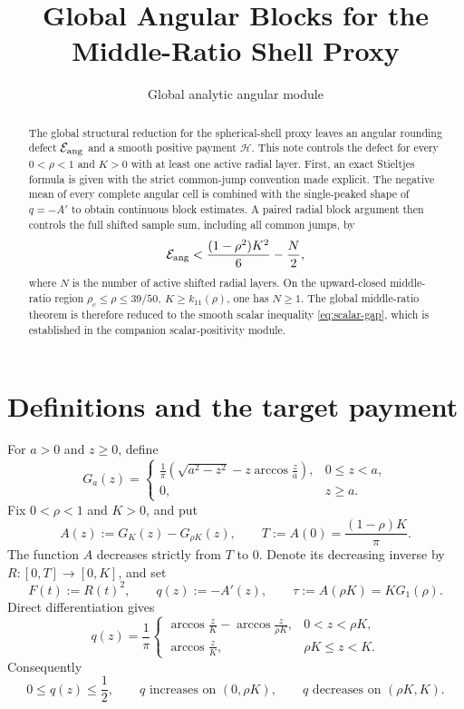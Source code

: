 \documentclass[11pt]{article}
\title{Global Angular Blocks for the Middle-Ratio Shell Proxy}
\author{}
\date{Global analytic angular module}
\theoremstyle{remark}
\begin{document}
\maketitle

\begin{abstract}
The global structural reduction for the spherical-shell proxy leaves an
angular rounding defect $\mathcal E_{\rm ang}$ and a smooth positive payment
$\mathcal H$.  This note controls the defect for every $0<\rho<1$ and $K>0$
with at least one active radial layer.  First, an exact Stieltjes formula is
given with the strict common-jump convention made explicit.  The negative
mean of every complete angular cell is combined with the single-peaked shape
of $q=-A'$ to obtain continuous block estimates.  A paired radial block
argument then controls the full shifted sample sum, including all common
jumps, by
\[
 \mathcal E_{\rm ang}
 <\frac{(1-\rho^2)K^2}{6}-\frac N2,
\]
where $N$ is the number of active shifted radial layers.  On the
upward-closed middle-ratio region
\(
 \rho_c\leq\rho\leq39/50,
 \ K\geq k_{11}(\rho)
\), one has $N\geq1$.  The global middle-ratio theorem is therefore reduced
to the smooth scalar inequality \eqref{eq:scalar-gap}, which is established
in the companion scalar-positivity module.
\end{abstract}

\section{Definitions and the target payment}

For $a>0$ and $z\geq0$, define
\begin{equation}
 G_a(z)=
 \begin{cases}
 \displaystyle\frac1\pi\left(\sqrt{a^2-z^2}
       -z\arccos\frac za\right),&0\leq z<a,\\[4pt]
 0,&z\geq a.
 \end{cases}
 \label{eq:G}
\end{equation}
Fix $0<\rho<1$ and $K>0$, and put
\begin{equation}
 A(z):=G_K(z)-G_{\rho K}(z),
 \qquad
 T:=A(0)=\frac{(1-\rho)K}{\pi}.
 \label{eq:A}
\end{equation}
The function $A$ decreases strictly from $T$ to $0$.  Denote its
decreasing inverse by $R:[0,T]\to[0,K]$, and set
\begin{equation}
 F(t):=R(t)^2,
 \qquad
 q(z):=-A'(z),
 \qquad
 \tau:=A(\rho K)=KG_1(\rho).
 \label{eq:inverse}
\end{equation}
Direct differentiation gives
\begin{equation}
 q(z)=\frac1\pi
 \begin{cases}
 \displaystyle
 \arccos\frac zK-\arccos\frac z{\rho K},&0<z<\rho K,\\[6pt]
 \displaystyle\arccos\frac zK,&\rho K\leq z<K.
 \end{cases}
 \label{eq:q}
\end{equation}
Consequently
\begin{equation}
 0\leq q(z)\leq\frac12,
 \qquad
 q\text{ increases on }(0,\rho K),
 \qquad
 q\text{ decreases on }(\rho K,K).
 \label{eq:q-shape}
\end{equation}
\end{document}
